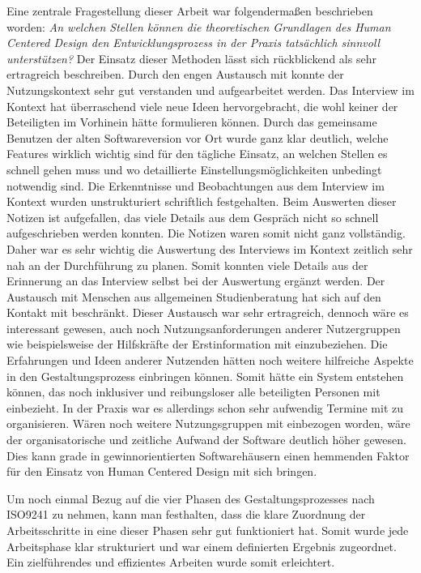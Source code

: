 Eine zentrale Fragestellung dieser Arbeit war folgendermaßen beschrieben
worden: \textit{An welchen Stellen können die theoretischen Grundlagen des
    Human Centered Design den Entwicklungsprozess in der Praxis tatsächlich
    sinnvoll unterstützen?} Der Einsatz dieser Methoden lässt sich rückblickend als
sehr ertragreich beschreiben. Durch den engen Austausch mit \ipName konnte der
Nutzungskontext sehr gut verstanden und aufgearbeitet werden. Das Interview im
Kontext hat überraschend viele neue Ideen hervorgebracht, die wohl keiner der
Beteiligten im Vorhinein hätte formulieren können. Durch das gemeinsame
Benutzen der alten Softwareversion vor Ort wurde ganz klar deutlich, welche
Features wirklich wichtig sind für den tägliche Einsatz, an welchen Stellen es
schnell gehen muss und wo detaillierte Einstellungsmöglichkeiten unbedingt
notwendig sind. Die Erkenntnisse und Beobachtungen aus dem Interview im Kontext
wurden unstrukturiert schriftlich festgehalten. Beim Auswerten dieser Notizen
ist aufgefallen, das viele Details aus dem Gespräch nicht so schnell
aufgeschrieben werden konnten. Die Notizen waren somit nicht ganz vollständig.
Daher war es sehr wichtig die Auswertung des Interviews im Kontext zeitlich
sehr nah an der Durchführung zu planen. Somit konnten viele Details aus der
Erinnerung an das Interview selbst bei der Auswertung ergänzt werden. Der
Austausch mit Menschen aus allgemeinen Studienberatung hat sich auf den Kontakt
mit \ipName beschränkt. Dieser Austausch war sehr ertragreich, dennoch wäre es
interessant gewesen, auch noch Nutzungsanforderungen anderer Nutzergruppen wie
beispielsweise der Hilfskräfte der Erstinformation mit einzubeziehen. Die
Erfahrungen und Ideen anderer Nutzenden hätten noch weitere hilfreiche Aspekte
in den Gestaltungsprozess einbringen können. Somit hätte ein System entstehen
können, das noch inklusiver und reibungsloser alle beteiligten Personen mit
einbezieht. In der Praxis war es allerdings schon sehr aufwendig Termine mit
\ipName zu organisieren. Wären noch weitere Nutzungsgruppen mit einbezogen
worden, wäre der organisatorische und zeitliche Aufwand der Software deutlich
höher gewesen. Dies kann grade in gewinnorientierten Softwarehäusern einen
hemmenden Faktor für den Einsatz von Human Centered Design mit sich bringen.

Um noch einmal Bezug auf die vier Phasen des Gestaltungsprozesses nach ISO9241
zu nehmen, kann man festhalten, dass die klare Zuordnung der Arbeitsschritte in
eine dieser Phasen sehr gut funktioniert hat. Somit wurde jede Arbeitsphase
klar strukturiert und war einem definierten Ergebnis zugeordnet. Ein
zielführendes und effizientes Arbeiten wurde somit erleichtert.

